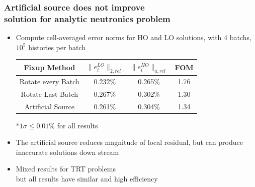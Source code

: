 \documentclass[xcolor=dvipsnames,hyperref={pdfpagelabels=false},unknownkeysallowed]{beamer}
\newcommand{\colb}[1]{{\color{blue} #1}}
\newcommand{\colG}[1]{{\color{Gray!110} #1}}
\newlength{\wideitemsep}
\let\olditem\item
\renewcommand{\item}{\setlength{\itemsep}{\wideitemsep}\olditem}
\begin{document}
\begin{frame}
    \frametitle{Artificial source does not improve \\ solution for analytic neutronics problem}
    \begin{itemize}
        \item Compute cell-averaged error norms for HO and LO solutions, with \colb{4
            batchs, $10^5$ histories per batch}
            \vspace{0.2in}
\begin{table}
    \begin{tabular}{c|ccc} \hline
        Fixup  Method & \multicolumn{1}{|c}{$\|e_{i}^{LO}\|_{2,rel}$} & 
        \multicolumn{1}{c}{$\|e_{i}^{HO}\|_{a,rel}$} &\multicolumn{1}{c}{FOM}
        \\ \hline
 Rotate every Batch &0.232\%       & 0.265\%   & 1.76  \\  
   Rotate Last Batch &0.267\%      & 0.302\%   & 1.30  \\ 
     Artificial Source &0.261\%    & 0.304\%   & 1.34  \\  \hline
    \end{tabular}
        \colG{*$1\sigma \leq 0.01 \%$ for all results}
\end{table}
    \item The artificial source reduces magnitude of local residual,
        but can produce inaccurate solutions down stream 
    \item Mixed results for TRT problems \\ \colG{but all results have similar and high efficiency}
    \end{itemize}
\end{frame}
\end{document}
